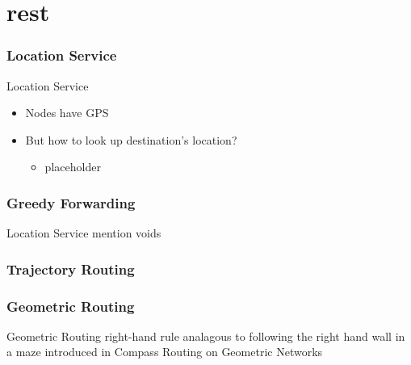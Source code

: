 \documentclass{beamer}
\begin{document}
\part{rest}

\section{Location Service}

\begin{frame}{Location Service}

	\begin{itemize}
		\item Nodes have GPS
		\item But how to look up destination's location?
		
		\begin{itemize}
			\item placeholder
		\end{itemize}
		
	\end{itemize}

\end{frame}


\section{Greedy Forwarding}

\begin{frame}{Location Service}
mention voids
\end{frame}


\section{Trajectory Routing}


\section{Geometric Routing}

\begin{frame}{Geometric Routing}
right-hand rule analagous to following the right hand wall in a maze
introduced in Compass Routing on Geometric Networks
\end{frame}
\end{document}
